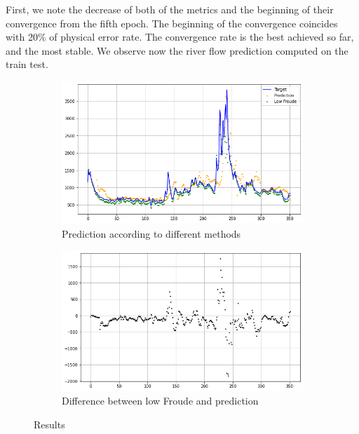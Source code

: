 First, we note the decrease of both of the metrics and the beginning of their convergence from the fifth epoch. The beginning of the convergence coincides with 20\% of physical error rate. The convergence rate is the best achieved so far, and the most stable. We observe now the river flow prediction computed on the train test.

\begin{figure}[H]
    \begin{subfigure}{0.45 \textwidth}
        \centering
        \includegraphics[scale = 0.35]{Graph/pred_low_fr_missour_lstm.png}
        \caption{Prediction according to different methods}
      
    \end{subfigure}
    \centering
     \begin{subfigure}{0.45 \textwidth}
         \centering
        \includegraphics[scale = 0.35]{Graph/diff_lowfr_pred_lstm.png}
        \caption{Difference between low Froude and prediction}
        
     \end{subfigure}
     \caption{Results}
\label{fig: lest result} 
\end{figure}



